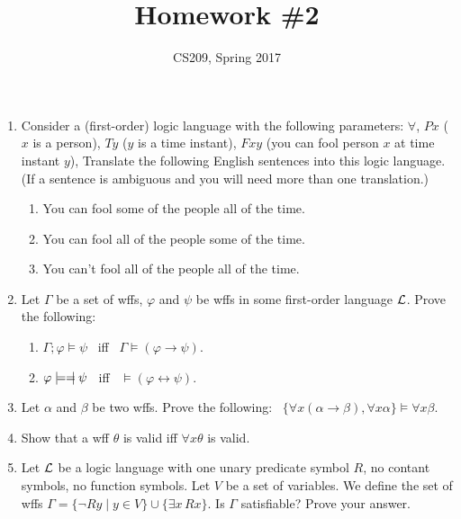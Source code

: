 \documentclass[12pt,letterpaper]{article}
\title{\bf Homework \#2\vspace*{-5mm}}
\author{\normalsize CS209, Spring 2017}
\date{\vspace*{-1cm}}
\def\Emodels{\models\hspace*{-3pt}{=}\hspace*{-6pt}\mid}
\begin{document}
\maketitle
\thispagestyle{empty}
\begin{enumerate}
\item
  Consider a (first-order) logic language with the following parameters:
  $\forall$,
  $Px$ ($x$ is a person),
  $Ty$ ($y$ is a time instant),
  $Fxy$ (you can fool person $x$ at time instant $y$),
  Translate the following English sentences
  into this logic language.
  (If a sentence is ambiguous and you will need
  more than one translation.)
  \vspace*{-2mm}
  \begin{enumerate}\itemsep 0pt
  \item You can fool some of the people all of the time.
  \item You can fool all of the people some of the time.
  \item You can't fool all of the people all of the time.
  \end{enumerate}

\item
  Let $\Gamma$ be a set of wffs,
  $\varphi$ and $\psi$ be wffs
  in some first-order language $\cal L$.
  Prove the following:
  \vspace*{-2mm}
  \begin{enumerate}\itemsep 0pt
  \item
    $\Gamma;\varphi\models\psi$ ~iff~
    $\Gamma\models(\varphi\rightarrow\psi)$.
  \item
    $\varphi\Emodels\psi$ ~iff~
    $\models(\varphi\leftrightarrow\psi)$.
  \end{enumerate}

\item
  Let $\alpha$ and $\beta$ be two wffs.
  Prove the following:~
  $\{\forall x(\alpha\rightarrow\beta), \forall x \alpha\}
  \models \forall x \beta$.

\item
  Show that a wff $\theta$ is valid iff $\forall x \theta$ is valid.

\item
  Let $\cal L$ be a logic language with one unary predicate
  symbol $R$, no contant symbols, no function symbols.
  Let $V$ be a set of variables.
  We define the set of wffs
  $\Gamma=\{\neg Ry\mid y\in V\}\cup\{\exists x\,Rx\}$.
  Is $\Gamma$ satisfiable? Prove your answer.


\end{enumerate}
\end{document}
